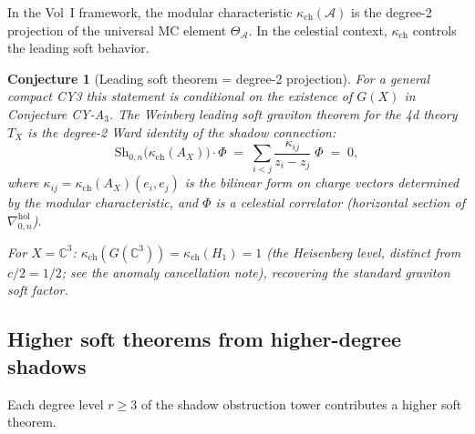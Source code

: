 \documentclass[11pt]{article}
\newtheorem{conjecture}[theorem]{Conjecture}
\theoremstyle{definition}
\theoremstyle{remark}
\newcommand{\cA}{\mathcal{A}}
\newcommand{\Sh}{\mathrm{Sh}}
\begin{document}
In the Vol~I framework, the modular characteristic $\kappa_{\mathrm{ch}}(\cA)$
is the degree-2 projection of the universal MC element $\Theta_\cA$.
In the celestial context, $\kappa_{\mathrm{ch}}$ controls the leading soft
behavior.

\begin{conjecture}[Leading soft theorem = degree-2 projection]
\label{conj:leading-soft-kappa}
For a general compact CY3 this statement is conditional on the
existence of $G(X)$ in Conjecture CY-A$_3$.
The Weinberg leading soft graviton theorem for the 4d theory $T_X$
is the degree-2 Ward identity of the shadow connection:
\begin{equation}\label{eq:leading-soft-kappa}
\Sh_{0,n}\bigl(\kappa_{\mathrm{ch}}(A_X)\bigr) \cdot \Phi
\;=\;
\sum_{i < j}
\frac{\kappa_{ij}}{z_i - z_j}\;\Phi
\;=\; 0,
\end{equation}
where $\kappa_{ij} = \kappa_{\mathrm{ch}}(A_X)(e_i, e_j)$ is the bilinear form
on charge vectors determined by the modular characteristic, and
$\Phi$ is a celestial correlator (horizontal section of
$\nabla^{\mathrm{hol}}_{0,n}$).

For $X = \mathbb{C}^3$: $\kappa_{\mathrm{ch}}(G(\mathbb{C}^3)) = \kappa_{\mathrm{ch}}(H_1) = 1$ (the
Heisenberg level, distinct from $c/2 = 1/2$; see the anomaly
cancellation note), recovering the standard graviton soft factor.
\end{conjecture}

\subsection{Higher soft theorems from higher-degree shadows}

Each degree level $r \geq 3$ of the shadow obstruction tower contributes a
higher soft theorem.
\end{document}
